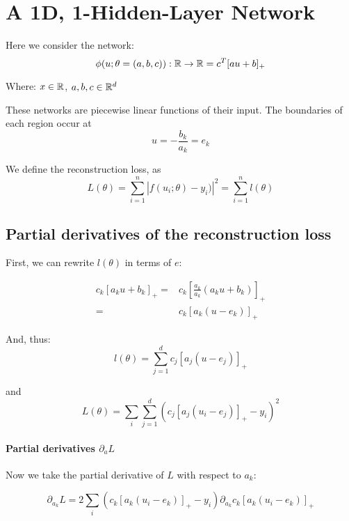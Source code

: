 \section{A 1D, 1-Hidden-Layer Network}

Here we consider the network:
\begin{equation}\label{eq:1layer1d}
    \phi(u; \theta=(a, b, c)) : \mathbb{R} \rightarrow \mathbb{R} = c^T[ au + b ]_{+} 
\end{equation}

Where: $x \in \mathbb{R}$, $a, b, c \in \mathbb{R}^d$

These networks are piecewise linear functions of their input. The boundaries of each region occur at
\begin{equation}
    u = -\frac{b_k}{a_k} = e_k
\end{equation}

We define the reconstruction loss, as 
\begin{equation}
    L(\theta) = \sum_{i=1}^n |f(u_i; \theta) - y_i)|^2 = \sum_{i=1}^n l(\theta)
\end{equation}


\subsection{Partial derivatives of the reconstruction loss}

First, we can rewrite $l(\theta)$ in terms of $e$:

\begin{align}
    c_k[a_k u + b_k]_+ =& c_k[\frac{a_k}{a_k} (a_k u + b_k)]_+ \\
                       =& c_k[a_k(u - e_k)]_+
\end{align}

And, thus:
\begin{equation}
    l(\theta) = \sum_{j=1}^d c_j[a_j(u - e_j)]_+
\end{equation}

and
\begin{equation}
    L(\theta) = \sum_i \sum_{j=1}^d (c_j[a_j(u_i - e_j)]_+ - y_i)^2
\end{equation}

\paragraph{Partial derivatives $\partial_a L$} Now we take the partial derivative of $L$ with respect to $a_k$:

\begin{equation}
    \partial_{a_k} L = 2 \sum_i (c_k [a_k(u_i - e_k)]_+ - y_i) \partial_{a_k} c_k[a_k(u_i - e_k)]_+
\end{equation}


